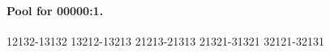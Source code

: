 \documentclass[11pt]{article}
\numberwithin{equation}{section}
\numberwithin{table}{section}
\begin{document}
\paragraph{Pool for 00000:1.}
\begingroup\footnotesize\ttfamily\begin{flushleft}
12132-13132 13212-13213 21213-21313 21321-31321 32121-32131\\
\end{flushleft}\endgroup
\begingroup
\setlength{\columnsep}{14pt}
\renewcommand{\paragraph}[1]{\par\addvspace{1ex}\noindent
  {\normalfont\small\bfseries #1}\par\nobreak}
\renewenvironment{flushleft}{\par\raggedright}{\par}
\end{document}
